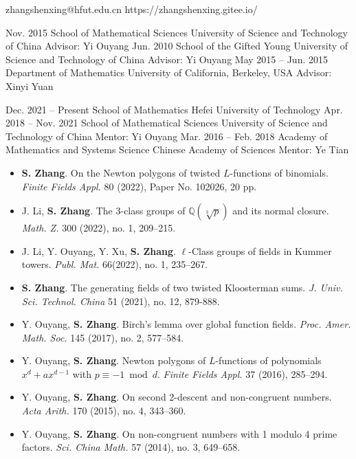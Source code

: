 \documentclass[11pt,a4paper]{article}
\begin{document}
	{}
	{zhangshenxing@hfut.edu.cn}
	{https://zhangshenxing.gitee.io/}


	{Nov. 2015}
	{School of Mathematical Sciences \entryskip
		University of Science and Technology of China}
	{Advisor: Yi Ouyang}
	{Jun. 2010}
	{School of the Gifted Young \entryskip
		University of Science and Technology of China}
	{Advisor: Yi Ouyang}
	{May 2015 -- Jun. 2015}
	{Department of Mathematics \entryskip
		University of California,	Berkeley, USA}
	{Advisor: Xinyi Yuan}


	{Dec. 2021 -- Present}
	{School of Mathematics \entryskip
		Hefei University of Technology}
	{}
	{Apr. 2018 -- Nov. 2021}
	{School of Mathematical Sciences \entryskip
		University of Science and Technology of China}
	{Mentor: Yi Ouyang}
	{Mar. 2016 -- Feb. 2018}
	{Academy of Mathematics and Systems Science \entryskip
		Chinese Academy of Sciences}
	{Mentor: Ye Tian}


\begin{itemize}
\item \textbf{S. Zhang}.
On the Newton polygons of twisted $L$-functions of binomials.
{\em Finite Fields Appl.} 80 (2022), Paper No. 102026, 20 pp.

\item J. Li, \textbf{S. Zhang}.
The $3$-class groups of $\mathbb{Q}(\sqrt[3]{p})$ and its normal closure.
{\em Math. Z.} 300 (2022), no. 1, 209--215.

\item J. Li, Y. Ouyang, Y. Xu, \textbf{S. Zhang}.
$\ell$-Class groups of fields in Kummer towers.
{\em Publ. Mat.} 66(2022), no. 1, 235--267.

\item \textbf{S. Zhang}.
The generating fields of two twisted Kloosterman sums.
{\em J. Univ. Sci. Technol. China} 51 (2021), no. 12, 879-888.

\item Y. Ouyang, \textbf{S. Zhang}.
Birch's lemma over global function fields.
{\em Proc. Amer. Math. Soc.} 145 (2017), no. 2, 577--584.

\item Y. Ouyang, \textbf{S. Zhang}.
Newton polygons of $L$-functions of polynomials $x^d+ax^{d-1}$ with $p\equiv -1 \bmod d$.
{\em Finite Fields Appl.} 37 (2016), 285--294.

\item Y. Ouyang, \textbf{S. Zhang}.
On second 2-descent and non-congruent numbers.
{\em Acta Arith.} 170 (2015), no. 4, 343--360.

\item Y. Ouyang, \textbf{S. Zhang}.
On non-congruent numbers with 1 modulo 4 prime factors.
{\em Sci. China Math.} 57 (2014), no. 3, 649--658.
\end{itemize}
\end{document}
